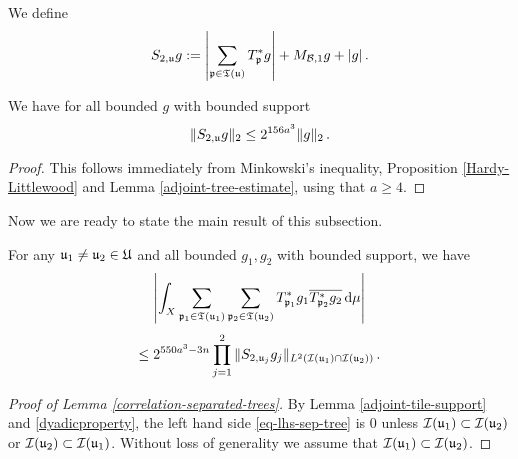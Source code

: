 {We define
$$
    S_{2,{\mathfrak u}}g := \left|\sum_{{\mathfrak p} \in {\mathfrak T}({\mathfrak u})} T_{{\mathfrak p}}^*g \right| + M_{\mathcal{B},1}g + |g|\,.
$$
\begin{lemma}
    \label{adjoint-tree-control}
    We have for all bounded $g$ with bounded support
    $$
        \|S_{2, {\mathfrak u}} g\|_2 \le 2^{156a^3} \|g\|_2\,.
    $$
\end{lemma}

\begin{proof}
    This follows immediately from Minkowski's inequality, Proposition \ref{Hardy-Littlewood} and Lemma \ref{adjoint-tree-estimate}, using that $a \ge 4$.
\end{proof}


Now we are ready to state the main result of this subsection.

\begin{lemma}
    \label{correlation-separated-trees}
    For any ${\mathfrak u}_1 \ne {\mathfrak u}_2 \in {\mathfrak U}$ and all bounded $g_1, g_2$ with bounded support, we have
    \begin{equation}
        \label{eq-lhs-sep-tree}
        \left| \int_X \sum_{{\mathfrak p}_1 \in {\mathfrak T}({\mathfrak u}_1)} \sum_{{\mathfrak p}_2 \in {\mathfrak T}({\mathfrak u}_2)} T^*_{{\mathfrak p}_1}g_1 \overline{T^*_{{\mathfrak p}_2}g_2 }\,\mathrm{d}\mu \right|
    \end{equation}
    \begin{equation}
        \label{eq-rhs-sep-tree}
        \le 2^{550a^3-3n} \prod_{j =1}^2 \| S_{2, {\mathfrak u}_j} g_j\|_{L^2({\mathcal{I}}({\mathfrak u}_1) \cap {\mathcal{I}}({\mathfrak u}_2))}\,.
    \end{equation}
\end{lemma}

\begin{proof}[Proof of Lemma \ref{correlation-separated-trees}]
    By Lemma \ref{adjoint-tile-support} and \eqref{dyadicproperty}, the left hand side \eqref{eq-lhs-sep-tree} is $0$ unless ${\mathcal{I}}({\mathfrak u}_1) \subset {\mathcal{I}}({\mathfrak u}_2)$ or ${\mathcal{I}}({\mathfrak u}_2) \subset {\mathcal{I}}({\mathfrak u}_1)$. Without loss of generality we assume that ${\mathcal{I}}({\mathfrak u}_1) \subset {\mathcal{I}}({\mathfrak u}_2)$.


\end{proof}}
